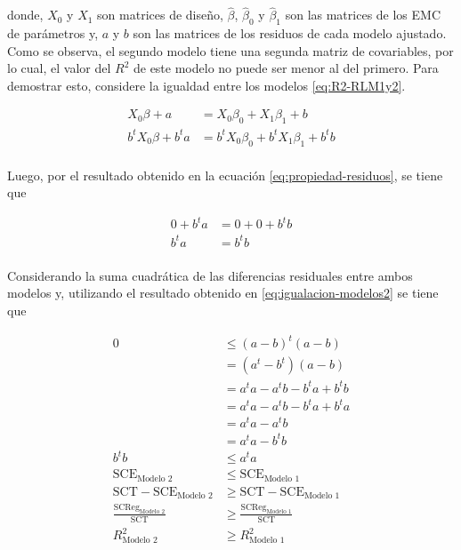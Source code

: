 \documentclass[
  11pt,
]{book}
\theoremstyle{definition}
\theoremstyle{definition}
\theoremstyle{definition}
\theoremstyle{definition}
\theoremstyle{remark}
\begin{document}
donde, \(X_0\) y \(X_1\) son matrices de diseño, \(\widehat{\beta}\), \(\widehat{\beta}_0\) y \(\widehat{\beta}_1\) son las matrices de los EMC de parámetros y, \(a\) y \(b\) son las matrices de los residuos de cada modelo ajustado. Como se observa, el segundo modelo tiene una segunda matriz de covariables, por lo cual, el valor del \(R^2\) de este modelo no puede ser menor al del primero. Para demostrar esto, considere la igualdad entre los modelos \eqref{eq:R2-RLM1y2}.

\begin{equation}
\begin{split}
X_0\beta + a &= X_0\beta_0 + X_1\beta_1 + b\\
b^tX_0\beta + b^ta &= b^tX_0\beta_0 + b^tX_1\beta_1 + b^tb\\
\end{split}
\label{eq:igualacion-modelos1}
\end{equation}

Luego, por el resultado obtenido en la ecuación \eqref{eq:propiedad-residuos}, se tiene que

\begin{equation}
\begin{split}
0 + b^ta &= 0 + 0 + b^tb\\
b^ta &=b^tb\\
\end{split}
\label{eq:igualacion-modelos2}
\end{equation}

Considerando la suma cuadrática de las diferencias residuales entre ambos modelos y, utilizando el resultado obtenido en \eqref{eq:igualacion-modelos2} se tiene que

\begin{equation}
\begin{split}
0 &\leq (a-b)^t(a-b)\\
&= (a^t-b^t)(a-b)\\
&= a^ta - a^tb - b^ta + b^tb\\
&= a^ta - a^tb - b^ta + b^ta\\
&= a^ta - a^tb\\
&= a^ta - b^tb\\
b^tb &\leq a^ta\\
\text{SCE}_{\text{Modelo 2}} &\leq \text{SCE}_{\text{Modelo 1}}\\
\text{SCT} - \text{SCE}_{\text{Modelo 2}} &\geq \text{SCT} - \text{SCE}_{\text{Modelo 1}}\\
\frac{\text{SCReg}_{\text{Modelo 2}}}{\text{SCT}} &\geq \frac{\text{SCReg}_{\text{Modelo 1}}}{\text{SCT}}\\
R^2_{\text{Modelo 2}} &\geq R^2_{\text{Modelo 1}}\\
\end{split}
\label{eq:igualacion-modelos3}
\end{equation}
\end{document}
